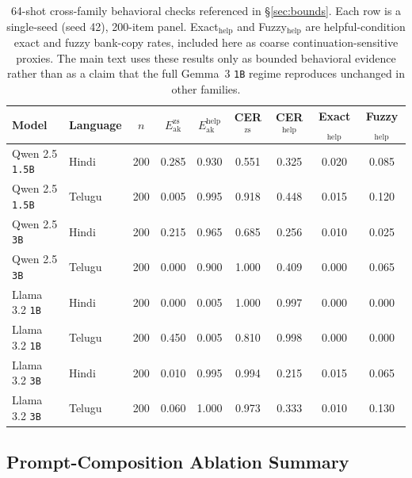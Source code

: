 \documentclass{article}
\begin{document}
\begin{table}[H]
\centering
\small
\setlength{\tabcolsep}{7pt}
\begin{tabular}{llccccccc}
\toprule
\textbf{Model} & \textbf{Language} & \textbf{$n$} & \textbf{$E_{\mathrm{ak}}^{\mathrm{zs}}$} & \textbf{$E_{\mathrm{ak}}^{\mathrm{help}}$} & \textbf{CER$^{\mathrm{zs}}$} & \textbf{CER$^{\mathrm{help}}$} & \textbf{Exact$_{\mathrm{help}}$} & \textbf{Fuzzy$_{\mathrm{help}}$} \\
\midrule
Qwen 2.5 \texttt{1.5B} & Hindi  & 200 & 0.285 & 0.930 & 0.551 & 0.325 & 0.020 & 0.085 \\
Qwen 2.5 \texttt{1.5B} & Telugu & 200 & 0.005 & 0.995 & 0.918 & 0.448 & 0.015 & 0.120 \\
Qwen 2.5 \texttt{3B}   & Hindi  & 200 & 0.215 & 0.965 & 0.685 & 0.256 & 0.010 & 0.025 \\
Qwen 2.5 \texttt{3B}   & Telugu & 200 & 0.000 & 0.900 & 1.000 & 0.409 & 0.000 & 0.065 \\
Llama 3.2 \texttt{1B}  & Hindi  & 200 & 0.000 & 0.005 & 1.000 & 0.997 & 0.000 & 0.000 \\
Llama 3.2 \texttt{1B}  & Telugu & 200 & 0.450 & 0.005 & 0.810 & 0.998 & 0.000 & 0.000 \\
Llama 3.2 \texttt{3B}  & Hindi  & 200 & 0.010 & 0.995 & 0.994 & 0.215 & 0.015 & 0.065 \\
Llama 3.2 \texttt{3B}  & Telugu & 200 & 0.060 & 1.000 & 0.973 & 0.333 & 0.010 & 0.130 \\
\bottomrule
\end{tabular}
\caption{64-shot cross-family behavioral checks referenced in \S\ref{sec:bounds}. Each row is a single-seed (seed 42), 200-item panel. Exact$_{\mathrm{help}}$ and Fuzzy$_{\mathrm{help}}$ are helpful-condition exact and fuzzy bank-copy rates, included here as coarse continuation-sensitive proxies. The main text uses these results only as bounded behavioral evidence rather than as a claim that the full Gemma~3 \texttt{1B} regime reproduces unchanged in other families.}
\label{tab:crossfamily}
\end{table}

\subsection{Prompt-Composition Ablation Summary}\label{app:promptcomp}
\end{document}
